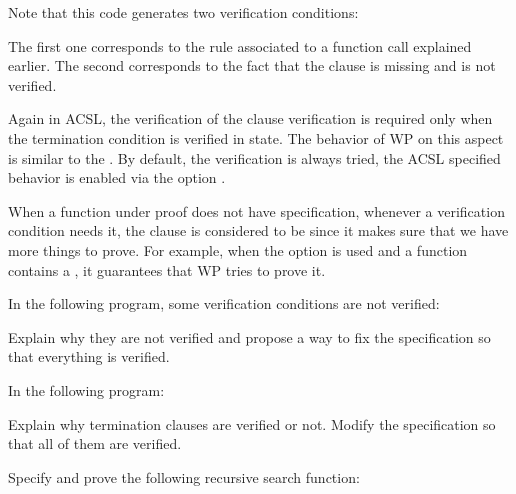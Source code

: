 

Note that this code generates two verification conditions:




The first one corresponds to the rule associated to a function call explained
earlier. The second corresponds to the fact that the 
clause is missing and is not verified.


Again in ACSL, the verification of the  clause
verification is required only when the termination condition is verified in
 state. The behavior of WP on this aspect is similar to the
. By default, the verification is always tried, the
ACSL specified behavior is enabled via the option
.




\begin{Information}
  When a function under proof does not have 
  specification, whenever a verification condition needs it, the clause is
  considered to be  since it makes sure that
  we have more things to prove. For example, when the option
   is used and a function contains a
  , it guarantees that WP tries to prove it.
\end{Information}






In the following program, some verification conditions are not verified:




Explain why they are not verified and propose a way to fix the specification so
that everything is verified.




In the following program:




Explain why termination clauses are verified or not. Modify the specification so
that all of them are verified.




Specify and prove the following recursive search function:


